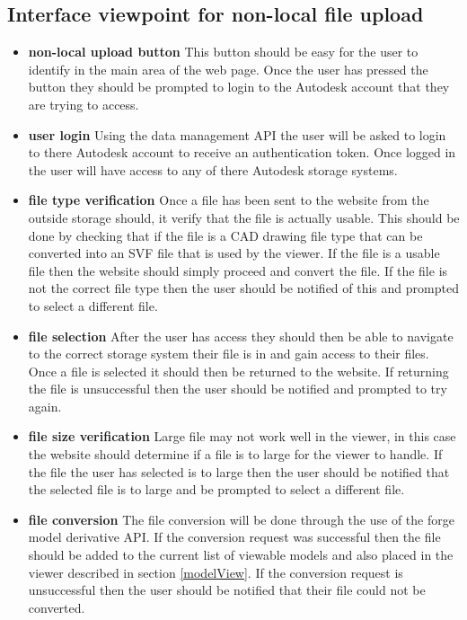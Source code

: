 \documentclass[letterpaper, 10pt, draftclsnofoot, compsoc, onecolumn]{IEEEtran}
\begin{document}
\subsection{Interface viewpoint for non-local file upload}
\begin{itemize}
	\item[]\textbf{non-local upload button} This button should be easy for the user to identify in the main area of the web page. Once the user has pressed the button they should be prompted to login to the Autodesk account that they are trying to access.
	\item[]\textbf{user login} Using the data management API the user will be asked to login to there Autodesk account to receive an authentication token. Once logged in the user will have access to any of there Autodesk storage systems. 
	\item[]\textbf{file type verification} Once a file has been sent to the website from the outside storage should, it verify that the file is actually usable. This should be done by checking that if the file is a CAD drawing file type that can be converted into an SVF file that is used by the viewer. If the file is a usable file then the 	
	website should simply proceed and convert the file. If the file is not the correct file type then the user should be notified of this and prompted to select a different file.  
	\item[]\textbf{file selection} After the user has access they should then be able to navigate to the correct storage system their file is in and gain access to their files. Once a file is selected it should then be returned to the website. If returning the file is unsuccessful then the user should be notified and prompted to try 
	again.
	\item[]\textbf{file size verification} Large file may not work well in the viewer, in this case the website should determine if a file is to large for the viewer to handle. If the file the user has selected is to large then the user should be 		
	notified that the selected file is to large and be prompted to select a different file.
	\item[]\textbf{file conversion} The file conversion will be done through the use of the forge model derivative API. If the conversion request was successful then the file should be added to the current list of viewable models and also placed in the viewer described in section \ref{modelView}. If the conversion request is unsuccessful then the user should
	 be notified that their file could not be converted. 
\end{itemize}
\end{document}
